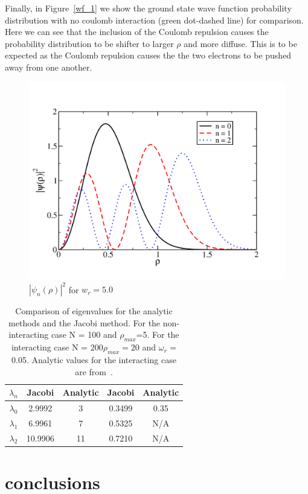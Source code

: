 \documentclass[prc,amsmath,twocolumn,superscriptaddress]{revtex4}
\begin{document}
Finally, in Figure~\ref{wf_1} we show the ground state wave function probability distribution with no coulomb interaction (green dot-dashed line) for comparison. Here we can see that the inclusion of the Coulomb repulsion causes the probability distribution to be shifter to larger $\rho$ and more diffuse. This is to be expected as the Coulomb repulsion causes the the two electrons to be pushed away from one another.

\begin{figure}[b]
\includegraphics[scale=0.33]{wf_5.pdf}
\caption{$|\psi_n(\rho)|^2$ for $w_r = 5.0$}
\label{wf_5}
\end{figure}

\begin{table}[t]
\centering
\begin{tabular}{|c|c|c|c|c|}
\hline
$\lambda_n$&Jacobi & Analytic & Jacobi & Analytic\\
\hline
$\lambda_0$&2.9992&3&0.3499&0.35\\
$\lambda_1$&6.9961&7&0.5325&N/A\\
$\lambda_2$&10.9906&11&0.7210&N/A\\
\hline
\end{tabular}
\caption{Comparison of eigenvalues for the analytic methods and the Jacobi method. For the non-interacting case N = 100 and $\rho_{max}$=5. For the interacting case N = 200$\rho_{max}=20$ and $\omega_r$ = 0.05. Analytic values for the interacting case are from~\cite{interact}.}
\label{eigen}
\end{table}

\section{conclusions}
\label{conc}
\end{document}
